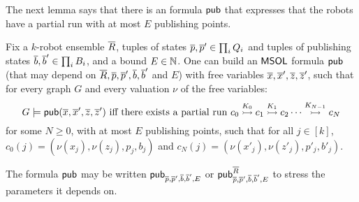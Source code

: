 

The next lemma says that there is an \msol formula $\pub$ that expresses that the robots have a partial run with at most $E$  publishing points.

\begin{lemma} \label{lem:boundedly-many-publishing-points}
Fix a $k$-robot ensemble $\tup{R}$, tuples of states $\tup{p},\tup{p}' \in \prod_i Q_i$ and tuples of publishing states 
$\tup{b},\tup{b}' \in \prod_i B_i$, and a bound $E \in \nat$.
One can build an $\msol$ formula $\pub$ (that may depend on $\tup{R},\tup{p},\tup{p}',\tup{b},\tup{b}'$ and $E$) with free variables 
$\tup{x}, \tup{x}', \tup{z},\tup{z}'$, such that for every graph $G$ and every valuation $\nu$ of the free variables:
\[ 
G \models \pub(\tup{x}, \tup{x}', \tup{z},\tup{z}') \mbox{ iff there exists a partial run $\onestep{c_0}{c_1}{K_0}\onestep{}{c_2}{K_1} \cdots \onestep{}{c_N}{K_{N-1}}$}
\]
for some $N \geq 0$, with at most $E$ publishing points, such that for all $j \in [k]$, $c_0(j) = 	(\nu(x_j),	\nu(z_j),		p_j,		b_j)$ and $c_N(j) =	(\nu(x'_j),	\nu(z'_j),	p'_j,	b'_j)$.

The formula $\pub$ may be written $\pub_{\tup{p},\tup{p}',\tup{b},\tup{b}',E}$ or $\pub^{\tup{R}}_{\tup{p},\tup{p}',\tup{b},\tup{b}',E}$ to stress the parameters it depends on.
\end{lemma}

